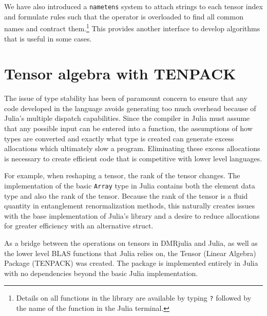 \documentclass{juliacon}
\begin{document}
We have also introduced a {\tt nametens} system to attach strings to each tensor index and formulate rules such that the {\tt *} operator is overloaded to find all common names and contract them.\footnote{Details on all functions in the library are available by typing {\tt ?} followed by the name of the function in the Julia terminal.} This provides another interface to develop algorithms that is useful in some cases.


\section{Tensor algebra with TENPACK}

The issue of type stability has been of paramount concern to ensure that any code developed in the language avoids generating too much overhead because of Julia's multiple dispatch capabilities. Since the compiler in Julia must assume that any possible input can be entered into a function, the assumptions of how types are converted and exactly what type is created can generate excess allocations which ultimately slow a program. Eliminating these excess allocations is necessary to create efficient code that is competitive with lower level languages.

For example, when reshaping a tensor, the rank of the tensor changes. The implementation of the basic {\tt Array} type in Julia contains both the element data type and also the rank of the tensor. Because the rank of the tensor is a fluid quantity in entanglement renormalization methods, this naturally creates issues with the base implementation of Julia's library and a desire to reduce allocations for greater efficiency with an alternative struct.

As a bridge between the operations on tensors in DMRjulia and Julia, as well as the lower level BLAS functions that Julia relies on, the Tensor (Linear Algebra) Package (TENPACK) was created. The package is implemented entirely in Julia with no dependencies beyond the basic Julia implementation.
\end{document}
